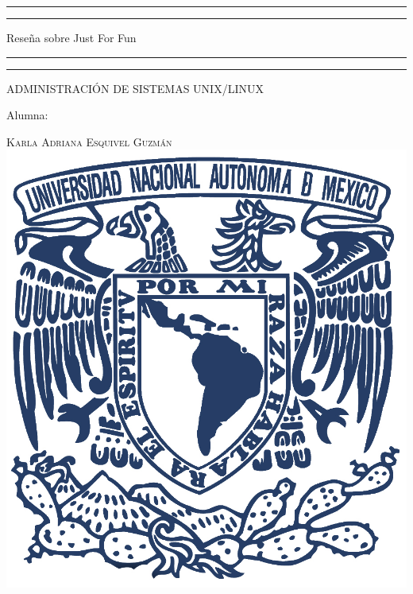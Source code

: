 \documentclass[a4paper, 11pt, oneside]{article}
\begin{document}
 

\begin{titlepage} 

	\centering 
	
	\scshape 
	
	\vspace*{\baselineskip} 
	
	
	
	\rule{\textwidth}{1.6pt}\vspace*{-\baselineskip}\vspace*{2pt} 
	\rule{\textwidth}{0.4pt} 
	
	\vspace{0.75\baselineskip} 
	
	{\LARGE Reseña sobre Just For Fun}	
	\vspace{0.75\baselineskip} 
	
	\rule{\textwidth}{0.4pt}\vspace*{-\baselineskip}\vspace{3.2pt}
	\rule{\textwidth}{1.6pt} 
	
	\vspace{2\baselineskip} 
	

	ADMINISTRACIÓN DE SISTEMAS UNIX/LINUX
	
	\vspace*{1\baselineskip} 
	
	\vfill
	
	
	Alumna:
	
	\vspace{0.2\baselineskip} 
	
	{\scshape\Large Karla Adriana Esquivel Guzmán}
	\vspace{0.5\baselineskip} 
	\vfill
	\includegraphics{unam.jpg}
	

\end{titlepage}
\end{document}
